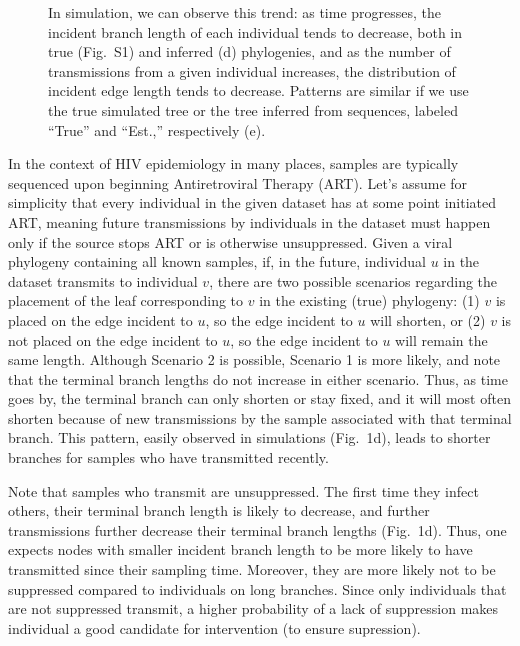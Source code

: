 \documentclass[a4paper,11pt]{article}
\newcommand{\PLWH}{sample\xspace}
\begin{document}
\begin{figure}[!tp]
{In simulation, we can observe this trend: as time progresses, the incident branch length of each individual tends to decrease, both in true (Fig.~S1) and inferred (d) phylogenies, and as the number of transmissions from a given individual increases, the distribution of incident edge length tends to decrease. Patterns are similar if we use the true simulated tree or the tree inferred from sequences, labeled ``True'' and ``Est.,'' respectively (e).}
\label{fig:diagram}
\end{figure}


In the context of HIV epidemiology in many places,
\PLWH{s} are typically sequenced
upon beginning Antiretroviral Therapy (ART).
Let's assume for simplicity that every individual in the given dataset has at some point initiated ART,
meaning future transmissions by individuals in the dataset must happen only if the source stops ART or is otherwise unsuppressed. %
Given a viral phylogeny containing all known \PLWH{s},
if, in the future,
individual $u$ in the dataset transmits to individual $v$,
there are two possible scenarios regarding the placement of the leaf corresponding to $v$ in the existing (true) phylogeny:
(1) $v$ is placed on the edge incident to $u$, so the edge incident to $u$ will shorten, or (2) $v$ is not placed on the edge incident to $u$, so the edge incident to $u$ will remain the same length.
Although Scenario 2 is possible,
Scenario 1 is more likely,\supercite{Romero-Severson2016} and note that the terminal branch lengths do not increase in either scenario. 
Thus, as time goes by, the terminal branch can only shorten or stay fixed, and it will most often shorten because of new transmissions by the \PLWH associated with that terminal branch.
This pattern, easily observed in simulations (Fig.~1d), leads to shorter branches for \PLWH{s} who have transmitted recently.

Note that \PLWH{s} who transmit are unsuppressed. The first time they infect others, their terminal branch length is likely to decrease, and further transmissions further decrease their terminal branch lengths (Fig.~1d). 
Thus, one expects nodes with smaller incident branch length to be more likely to have transmitted since their sampling time.
Moreover, they are more likely not to be  suppressed compared to individuals on long branches. 
Since only individuals that are not suppressed transmit, a higher probability of a lack of suppression makes individual a good candidate for intervention (to ensure supression). 
\end{document}
